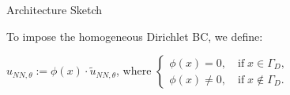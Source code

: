 \begin{frame}{Architecture Sketch}
\begin{tikzpicture}[shorten >=1pt,->,draw=black!50, node distance=\layersep]
\end{tikzpicture}

\vspace{0.2cm}
\small To impose the homogeneous Dirichlet BC, we define:

$u_{NN, \theta} := \phi(x) \cdot \tilde{u}_{NN, \theta}$, where 
$ \left\{
\begin{array}{l}
\phi(x) = 0,  \quad \text{if} \; x \in \Gamma_D,\\ 
\phi(x) \neq 0, \quad \text{if} \; x \not \in \Gamma_D.
\end{array}
\right.$

\end{frame}
